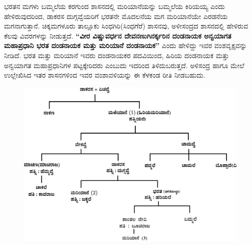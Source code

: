 ಭರತನ ಮಗಳು ಬಮ್ಮಲೆಯ ಕರಗುಂದ ಶಾಸನದಲ್ಲಿ ಮರಿಯಾನೆಯನ್ನು ಬಮ್ಮಲೆಯ ಕಿರಿಯಯ್ಯ ಎಂದು ಹೇಳಿರುವುದರಿಂದ, ಡಾಕರಸ ದುಗ್ಗವ್ವೆಯರಿಗೆ ಭರತನೇ ಮೊದಲನೆಯ ಮಗ ಮರಿಯಾನೆಯೇ ಎರಡನೆಯ ಮಗನಾಗುತ್ತಾನೆ. ಚಿಕ್ಕಮಗಳೂರು ತಾಲ್ಲೂಕು ಸಿಂಧಗಿರಿ(ಸಿಂಧಗೆರೆ) ಶಾಸನವು, ಅಳೀಸಂದ್ರದ ಶಾಸನದಲ್ಲಿ ಹೇಳಿರುವ ಕೆಲವು ವಿವರಗಳನ್ನು ನೀಡುತ್ತದೆ. \textbf{“ವೀರ ವಿಷ್ಣುವರ್ಧನ ದೇವನಣುಗಿನರ್ಕ್ಕರಿನ ದಂಡನಾಯಕ ಅನ್ವಯಾಗತ ಮಹಾಪ್ರಧಾನಿ ಭರತ ದಂಡನಾಯಕ ಮತ್ತು ಮರಿಯಾನೆ ದಂಡನಾಯಕ”} ಎಂದು ಹೇಳಿದ್ದು ಇವರ ವಂಶವೃಕ್ಷವನ್ನು ನೀಡಿದೆ. ಭರತ ಮತ್ತು ಮರಿಯಾನೆ ಇವರು ದಂಡನಾಯಕರ ಪದವಿಯಿಂದ, ಹಿರಿಯ ದಂಡನಾಯಕ ಮತ್ತು ಅನ್ವಯಾಗತ ಮಹಾಪ್ರಧಾನಿಗಳ ಪಟ್ಟಕ್ಕೇರಿದರು ಎಂಬುದು ಇದರಿಂದ ತಿಳಿದುಬರುತ್ತದೆ. ಅಳಿಸಂದ್ರ ಹಾಗೂ ಮೇಲೆ ಉಲ್ಲೇಖಿಸಿದ ಇತರ ಶಾಸನಗಳಿಂದ ಇವರ ವಂಶಾವಳಿಯನ್ನು ಈ ಕೆಳಕಂಡ ರೀತಿ ನೀಡಬಹುದು.

\begin{figure}[H]
\includegraphics[scale=1.15]{images/chap3/chap3fig13.jpeg}
\end{figure}

